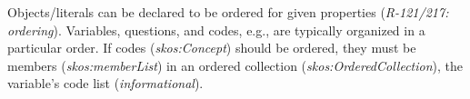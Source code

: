 \documentclass[conference]{IEEEtran}
\begin{document}

Objects/literals can be declared to be ordered for given properties (\emph{R-121/217: ordering}).
Variables, questions, and codes, e.g., are typically organized in a particular order. 
If codes (\emph{skos:Concept}) should be ordered, they must be members (\emph{skos:memberList}) in an ordered collection (\emph{skos:OrderedCollection}), the variable's code list (\emph{informational}).
\end{document}
